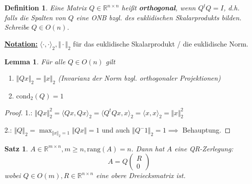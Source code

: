 \documentclass{book}
\newtheorem{theorem}[algorithm]{Satz}
\newtheorem{lemma}[algorithm]{Lemma}
\newtheorem{definition}[algorithm]{Definition}
\def\R{\mathbb{R}}
\def\rang{\text{rang}}
\def\cond{\text{cond}}
\begin{document}
            \begin{definition}\label{d2.8}
                Eine Matrix $Q\in\R^{n\times n}$ heißt \textbf{orthogonal}, wenn $Q^tQ=I$, d.h. falls die Spalten von $Q$ eine ONB bzgl. des 
                euklidischen Skalarprodukts bilden. Schreibe $Q\in O(n)$.
            \end{definition}

            \underline{\textbf{Notation:}} $\langle \cdot,\cdot \rangle_2,\Vert \cdot \Vert_2$ für das euklidische Skalarprodukt / die euklidische Norm.

            \begin{lemma}\label{l2.9}
                Für alle $Q\in O(n)$ gilt
                \begin{enumerate}
                    \item $\Vert Qx \Vert_2=\Vert x \Vert_2$ (Invarianz der Norm bzgl. orthogonaler Projektionen)
                    \item $\cond_2(Q)=1$
                \end{enumerate}
            \end{lemma}

            \begin{proof}
                1.: $\Vert Qx \Vert_2^2=\langle Qx,Qx \rangle_2=\langle Q^tQx,x \rangle_2=\langle x,x \rangle_2=\Vert x \Vert_2^2$

                2.: $\Vert Q \Vert_2=\max_{\Vert x \Vert_2=1}\Vert Qx \Vert=1$ und auch $\Vert Q^-1 \Vert_2=1\implies$ Behauptung.
            \end{proof}

            \begin{theorem}\label{s2.10}
                $A\in\R^{m\times n},m\geq n,\rang(A)=n$. Dann hat $A$ eine QR-Zerlegung:
                \begin{equation*}
                    A=Q\begin{pmatrix*}
                        R\\
                        0
                    \end{pmatrix*}
                \end{equation*}
                wobei $Q\in O(m),R\in\R^{n\times n}$ eine obere Dreiecksmatrix ist.
            \end{theorem}
\end{document}
